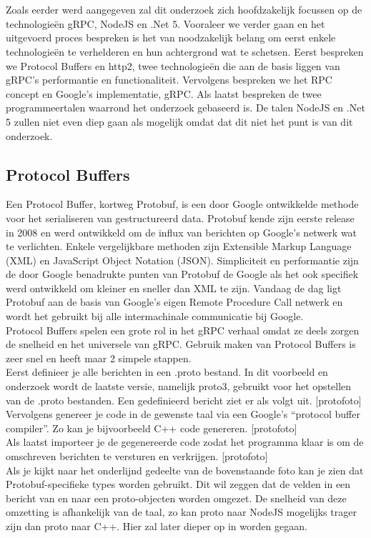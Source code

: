 \chapter{}
\label{ch:stand-van-zaken}
Zoals eerder werd aangegeven zal dit onderzoek zich hoofdzakelijk focussen op de technologieën gRPC, NodeJS en .Net 5. Vooraleer we verder gaan en het uitgevoerd proces bespreken is het van noodzakelijk belang om eerst enkele technologieën te verhelderen en hun achtergrond wat te schetsen. Eerst bespreken we Protocol Buffers en http2, twee technologieën die aan de basis liggen van gRPC's performantie en functionaliteit. Vervolgens bespreken we het RPC concept en Google's implementatie, gRPC. Als laatst bespreken de twee programmeertalen waarrond het onderzoek gebaseerd is. De talen NodeJS en .Net 5 zullen niet even diep gaan als mogelijk omdat dat dit niet het punt is van dit onderzoek.
\section{Protocol Buffers}
Een Protocol Buffer, kortweg Protobuf, is een door Google ontwikkelde methode voor het serialiseren van gestructureerd data. Protobuf kende zijn eerste release in 2008 en werd ontwikkeld om de influx van berichten op Google's netwerk wat te verlichten. Enkele vergelijkbare methoden zijn Extensible Markup Language (XML) en JavaScript Object Notation (JSON). Simpliciteit en performantie zijn de door Google benadrukte punten van Protobuf de Google als het ook specifiek werd ontwikkeld om kleiner en sneller dan XML te zijn. Vandaag de dag ligt Protobuf aan de basis van Google's eigen Remote Procedure Call netwerk en wordt het gebruikt bij alle intermachinale communicatie bij Google. \\
Protocol Buffers spelen een grote rol in het gRPC verhaal omdat ze deels zorgen de snelheid en het universele van gRPC. Gebruik maken van Protocol Buffers is zeer snel en heeft maar 2 simpele stappen.\\
Eerst definieer je alle berichten in een .proto bestand. In dit voorbeeld en onderzoek wordt de laatste versie, namelijk proto3, gebruikt voor het opstellen van de .proto bestanden. Een gedefinieerd bericht ziet er als volgt uit. [protofoto]\\
Vervolgens genereer je code in de gewenste taal via een Google's ``protocol buffer compiler''. Zo kan je bijvoorbeeld C++ code genereren. [protofoto]\\
Als laatst importeer je de gegenereerde code zodat het programma klaar is om de omschreven berichten te versturen en verkrijgen. [protofoto]\\
Als je kijkt naar het onderlijnd gedeelte van de bovenstaande foto kan je zien dat Protobuf-specifieke types worden gebruikt. Dit wil zeggen dat de velden in een bericht van en naar een proto-objecten worden omgezet. De snelheid van deze omzetting is afhankelijk van de taal, zo kan proto naar NodeJS mogelijks trager zijn dan proto naar C++. Hier zal later dieper op in worden gegaan.
